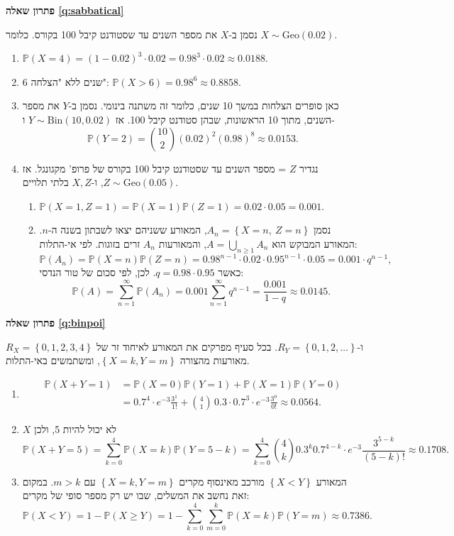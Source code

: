 \documentclass[11pt,a4paper]{report}
\newcommand{\flag}{\tikz[baseline=-0.1ex,x=0.9ex,y=0.9ex]{\draw[line width=0.5pt] (0,-0.3)--(0,1.6); \fill (0,1.6)--(1.2,1.2)--(0,0.8)--cycle;}}
\newcounter{todo}
\newcommand{\addtodo}[1]{\refstepcounter{todo}%
  \addcontentsline{tdo}{todo}{\protect\numberline{\thetodo}#1}}
\newcommand{\needcheck}[1]{\addtodo{#1}%
  {\color{todoc}\sffamily\small\,[\textbf{\flag{}\,\thetodo\ לבדיקה:} #1]\,}}
\renewcommand{\needcheck}[1]{}
\newcommand{\set}[1]{\left\{#1\right\}}
\newcommand{\PP}{\mathbb{P}}
\newcommand{\Bin}{\mathrm{Bin}}
\newcommand{\Geo}{\mathrm{Geo}}
\newenvironment{solution}[1]{\par\bigskip\noindent
  {\sffamily\bfseries\color{thmc}פתרון שאלה \ref{q:#1}}\par\nopagebreak\smallskip}%
  {\par\medskip\noindent{\color{exc!50}\rule{\linewidth}{0.4pt}}\par}
\newcommand{\ans}[1]{\boxed{#1}}
\begin{document}
\begin{solution}{sabbatical}
נסמן ב-$X$ את מספר השנים עד שסטודנט קיבל 100 בקורס. כלומר $X\sim\Geo(0.02)$.
\begin{enumerate}[label=(\alph*)]
  \item $\PP(X=4)=(1-0.02)^3\cdot0.02=0.98^3\cdot0.02\approx\ans{0.0188}$.
  \item 6 שנים ללא "הצלחה": $\PP(X>6)=0.98^6\approx\ans{0.8858}$.
  \item כאן סופרים הצלחות במשך 10 שנים, כלומר זה משתנה בינומי. נסמן ב-$Y$ את מספר השנים, מתוך 10 הראשונות, שבהן סטודנט קיבל 100. אז $Y\sim\Bin(10,0.02)$ ו-
  \[
    \PP(Y=2)=\binom{10}2(0.02)^2(0.98)^8\approx\ans{0.0153}.
  \]
  \item נגדיר $Z$ = מספר השנים עד שסטודנט קיבל 100 בקורס של פרופ' מקגונגל. אז $Z\sim\Geo(0.05)$, ו-$X,Z$ בלתי תלויים.
  \begin{enumerate}[label=(\roman*)]
    \item $\PP(X=1,Z=1)=\PP(X=1)\PP(Z=1)=0.02\cdot0.05=\ans{0.001}$.
    \item נסמן $A_n=\set{X=n,\ Z=n}$, המאורע ששניהם יצאו לשבתון בשנה ה-$n$. המאורע המבוקש הוא $A=\bigcup_{n\ge1}A_n$, והמאורעות $A_n$ זרים בזוגות. לפי אי-התלות:
    \[
      \PP(A_n)=\PP(X=n)\PP(Z=n)=0.98^{n-1}\cdot0.02\cdot0.95^{n-1}\cdot0.05=0.001\cdot q^{n-1},
    \]
    כאשר $q=0.98\cdot0.95$. לכן, לפי סכום של טור הנדסי:
    \[
      \PP(A)=\sum_{n=1}^\infty\PP(A_n)=0.001\sum_{n=1}^\infty q^{n-1}=\frac{0.001}{1-q}\approx\ans{0.0145}.
    \]
    \needcheck{בדף הפתרונות היה כאן סכום חסר ונכתב $X,Y$ במקום $X,Z$; תיקנתי. התוצאה $0.0144$ עוגלה ל-$0.0145$}
  \end{enumerate}
\end{enumerate}
\end{solution}

\begin{solution}{binpoi}
$R_X=\set{0,1,2,3,4}$ ו-$R_Y=\set{0,1,2,\dots}$. בכל סעיף מפרקים את המאורע לאיחוד זר של מאורעות מהצורה $\set{X=k,Y=m}$, ומשתמשים באי-התלות.
\begin{enumerate}[label=(\alph*)]
  \item
  \[
  \begin{split}
    \PP(X+Y=1)&=\PP(X=0)\PP(Y=1)+\PP(X=1)\PP(Y=0)\\
    &=0.7^4\cdot e^{-3}\frac{3^1}{1!}+\binom41\,0.3\cdot0.7^3\cdot e^{-3}\frac{3^0}{0!}\approx\ans{0.0564}.
  \end{split}
  \]
  \item $X$ לא יכול להיות 5, ולכן
  \[
    \PP(X+Y=5)=\sum_{k=0}^4\PP(X=k)\PP(Y=5-k)=\sum_{k=0}^4\binom4k0.3^k0.7^{4-k}\cdot e^{-3}\frac{3^{5-k}}{(5-k)!}\approx\ans{0.1708}.
  \]
  \item המאורע $\set{X<Y}$ מורכב מאינסוף מקרים $\set{X=k,Y=m}$ עם $m>k$. במקום זאת נחשב את המשלים, שבו יש רק מספר סופי של מקרים:
  \[
    \PP(X<Y)=1-\PP(X\ge Y)=1-\sum_{k=0}^4\sum_{m=0}^k\PP(X=k)\PP(Y=m)\approx\ans{0.7386}.
  \]
  \needcheck{בדף הפתרונות התוצאות הושארו כביטויים; הוספתי ערכים מספריים (חושבו במחשב)}
\end{enumerate}
\end{solution}
\end{document}
